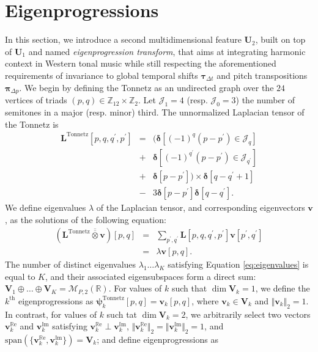 \documentclass{article}
\makeatletter
\def\resp{resp.\@\xspace}
\makeatother
\begin{document}
\section{Eigenprogressions}\label{sec:eigenprogressions}
In this section, we introduce a second multidimensional feature $\mathbf{U}_2$, built on top of $\mathbf{U}_1$ and named \emph{eigenprogression transform}, that aims at integrating harmonic context in Western tonal music while still respecting the aforementioned requirements of invariance to global temporal shifts $\boldsymbol{\tau}_{\Delta t}$ and pitch transpositions $\boldsymbol{\pi}_{\Delta p}$.
We begin by defining the Tonnetz as an undirected graph over the $24$ vertices of triads $(p,q)\in\mathbb{Z}_{12} \times \mathbb{Z}_2$.
Let $\mathcal{J}_1 = 4$ (\resp{} $\mathcal{J}_0 = 3$) the number of semitones in a major (\resp{} minor) third.
The unnormalized Laplacian tensor of the Tonnetz is
\begin{eqnarray}
\mathbf{L}^{\mathrm{Tonnetz}}[p,q,q^\prime,p^\prime] &= &
\Big( \boldsymbol{\delta}[(-1)^q (p-p^\prime) \in\mathcal{J}_q] \nonumber  \\
& + & \boldsymbol{\delta}[(-1)^{q^\prime} (p-p^\prime) \in\mathcal{J}_{q^\prime}] \nonumber  \\
& + & \boldsymbol{\delta}[p-p^\prime]\Big) \times \boldsymbol{\delta}[q-q^\prime+1] \nonumber \\ 
& - & 3 \boldsymbol{\delta}[p-p^\prime]\boldsymbol{\delta}[q-q^\prime].
\end{eqnarray}
We define eigenvalues $\lambda$ of the Laplacian tensor, and corresponding eigenvectors $\mathbf{v}$, as the solutions of the following equation:
\begin{eqnarray}
(\mathbf{L}^{\mathrm{Tonnetz}} \overline{\overline{\otimes}} \mathbf{v})[p,q]
& = & \sum_{p^\prime,q^\prime} \mathbf{L}[p,q,q^\prime,p^\prime] \mathbf{v}[p^\prime,q^\prime] \nonumber \\
& = &
\lambda \mathbf{v}[p,q].
\label{eq:eigenvalues}
\end{eqnarray}
The number of distinct eigenvalues $\lambda_1 \ldots \lambda_K$ satisfying Equation \ref{eq:eigenvalues} is equal to $K$, and their associated eigensubspaces form a direct sum:
$\mathbf{V}_1 \oplus \ldots \oplus \mathbf{V}_K = \mathcal{M}_{P,2}(\mathbb{R})$.
For values of $k$ such that $\dim \mathbf{V}_k = 1$, we define the $k^\textrm{th}$ eigenprogressions as
$\boldsymbol{\psi}^{\mathrm{Tonnetz}}_k [p,q] = \mathbf{v}_k[p,q]$, where $\mathbf{v}_k \in \mathbf{V}_k$ and $\Vert \mathbf{v}_k \Vert_2 = 1$.
In contrast, for values of $k$ such tat $\dim \mathbf{V}_k = 2$, we arbitrarily select two vectors $\mathbf{v}_k^{\mathbb{R}\mathrm{e}}$ and $\mathbf{v}_k^{\mathbb{I}\mathrm{m}}$ satisfying $\mathbf{v}_k^{\mathbb{R}\mathrm{e}} \perp \mathbf{v}_k^{\mathbb{I}\mathrm{m}}$, $\Vert\mathbf{v}_k^{\mathbb{R}\mathrm{e}}\Vert_2 = \Vert\mathbf{v}_k^{\mathbb{I}\mathrm{m}}\Vert_2 = 1$, and $\mathrm{span}(\{\mathbf{v}_k^{\mathbb{R}\mathrm{e}},\mathbf{v}_k^{\mathbb{I}\mathrm{m}}\})=\mathbf{V}_k$; and define eigenprogressions as
\end{document}
